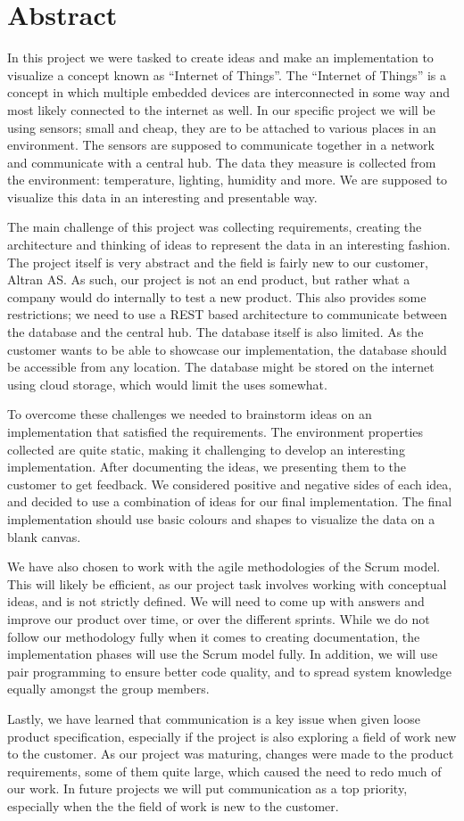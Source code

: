 ﻿\documentclass[../document.tex]{subfiles}
\begin{document}
\section*{Abstract}
In this project we were tasked to create ideas and make an implementation to visualize a concept known as ``Internet of Things''. The ``Internet of Things'' is a concept in which multiple embedded devices are interconnected in some way and most likely connected to the internet as well. In our specific project we will be using sensors; small and cheap, they are to be attached to various places in an environment. The sensors are supposed to communicate together in a network and communicate with a central hub. The data they measure is collected from the environment: temperature, lighting, humidity and more. We are supposed to visualize this data in an interesting and presentable way.

The main challenge of this project was collecting requirements, creating the architecture and thinking of ideas to represent the data in an interesting fashion. The project itself is very abstract and the field is fairly new to our customer, Altran AS. As such, our project is not an end product, but rather what a company would do internally to test a new product. This also provides some restrictions; we need to use a REST based architecture to communicate between the database and the central hub. The database itself is also limited. As the customer wants to be able to showcase our implementation, the database should be accessible from any location. The database might be stored on the internet using cloud storage, which would limit the uses somewhat.

To overcome these challenges we needed to brainstorm ideas on an implementation that satisfied the requirements. The environment properties collected are quite static, making it challenging to develop an interesting implementation. After documenting the ideas, we presenting them to the customer to get feedback. We considered positive and negative sides of each idea, and decided to use a combination of ideas for our final implementation. The final implementation should use basic colours and shapes to visualize the data on a blank canvas.

We have also chosen to work with the agile methodologies of the Scrum model. This will likely be efficient, as our project task involves working with conceptual ideas, and is not strictly defined. We will need to come up with answers and improve our product over time, or over the different sprints. While we do not follow our methodology fully when it comes to creating documentation, the implementation phases will use the Scrum model fully. In addition, we will use pair programming to ensure better code quality, and to spread system knowledge equally amongst the group members.

Lastly, we have learned that communication is a key issue when given loose product specification, especially if the project is also exploring a field of work new to the customer. As our project was maturing, changes were made to the product requirements, some of them quite large, which caused the need to redo much of our work. In future projects we will put communication as a top priority, especially when the the field of work is new to the customer.
\end{document}
